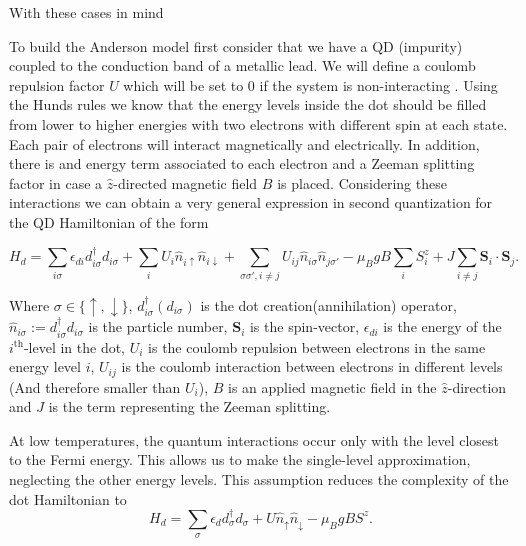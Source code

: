 
With these cases in mind 


To build the Anderson model first consider that we have a QD (impurity) coupled to the conduction band of a metallic lead. We will define a coulomb repulsion factor $U$ which will be set to $0$ if the system is non-interacting . Using the Hunds rules we know that the energy levels inside the dot should be filled from lower to higher energies with two electrons with different spin at each state. Each pair of electrons will interact magnetically and electrically. In addition, there is and energy term associated to each electron and a Zeeman splitting factor in case a $\hat{z}$-directed magnetic field $B$ is placed.  Considering these interactions we can obtain a very general expression in second quantization for the QD Hamiltonian
of the form \citep[(3.2)]{sindel_numerical_2005}

\[
H_{d}=\sum_{i\sigma}\epsilon_{di}d_{i\sigma}^{\dagger}d_{i\sigma}+\sum_{i}U_{i}\hat{n}_{i\uparrow}\hat{n}_{i\downarrow}+\sum_{\sigma\sigma',i\neq j}U_{ij}\hat{n}_{i\sigma}\hat{n}_{j\sigma'}-\mu_{B}gB\sum_{i}S_{i}^{z}+J\sum_{i\neq j}\mathbf{S}_{i}\cdot\mathbf{S}_{j}.
\]


Where $\sigma\in\{\uparrow,\downarrow\}$, $d_{i\sigma}^{\dagger}\left(d_{i\sigma}\right)$
is the dot creation(annihilation) operator,$\hat{n}_{i\sigma}:=d_{i\sigma}^{\dagger}d_{i\sigma}$
is the particle number, $\mathbf{S}_{i}$ is the spin-vector, $\epsilon_{di}$
is the energy of the $i^{\mbox{th}}$-level in the dot, $U_{i}$ is
the coulomb repulsion between electrons in the same energy level $i$,
$U_{ij}$ is the coulomb interaction between electrons in different
levels (And therefore smaller than $U_{i}$), \textbf{$B$} is an
applied magnetic field in the $\hat{z}$-direction and $J$ is the
term representing the Zeeman splitting. 

At low temperatures, the quantum interactions occur only with the level closest to the Fermi energy. This allows us to make the single-level approximation, neglecting the other energy levels. This assumption reduces the complexity of the dot Hamiltonian to \\


\begin{equation}
    H_{d}=\sum_{\sigma}\epsilon_{d}d_{\sigma}^{\dagger}d_{\sigma}+U\hat{n}_{\uparrow}\hat{n}_{\downarrow}-\mu_{B}gBS^{z}. \label{eq:hdot}
\end{equation}

